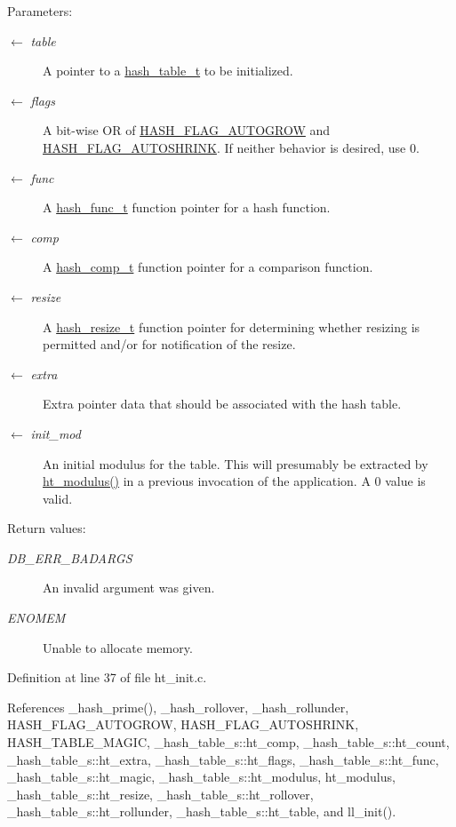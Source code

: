 \begin{Desc}
\item[Parameters:]
\begin{description}
\item[\mbox{$\leftarrow$} {\em table}]A pointer to a \hyperlink{group__dbprim__hash_ga1}{hash\_\-table\_\-t} to be initialized. \item[\mbox{$\leftarrow$} {\em flags}]A bit-wise OR of \hyperlink{group__dbprim__hash_ga22}{HASH\_\-FLAG\_\-AUTOGROW} and \hyperlink{group__dbprim__hash_ga23}{HASH\_\-FLAG\_\-AUTOSHRINK}. If neither behavior is desired, use 0. \item[\mbox{$\leftarrow$} {\em func}]A \hyperlink{group__dbprim__hash_ga4}{hash\_\-func\_\-t} function pointer for a hash function. \item[\mbox{$\leftarrow$} {\em comp}]A \hyperlink{group__dbprim__hash_ga5}{hash\_\-comp\_\-t} function pointer for a comparison function. \item[\mbox{$\leftarrow$} {\em resize}]A \hyperlink{group__dbprim__hash_ga6}{hash\_\-resize\_\-t} function pointer for determining whether resizing is permitted and/or for notification of the resize. \item[\mbox{$\leftarrow$} {\em extra}]Extra pointer data that should be associated with the hash table. \item[\mbox{$\leftarrow$} {\em init\_\-mod}]An initial modulus for the table. This will presumably be extracted by \hyperlink{group__dbprim__hash_ga29}{ht\_\-modulus()} in a previous invocation of the application. A 0 value is valid.\end{description}
\end{Desc}
\begin{Desc}
\item[Return values:]
\begin{description}
\item[{\em DB\_\-ERR\_\-BADARGS}]An invalid argument was given. \item[{\em ENOMEM}]Unable to allocate memory.\end{description}
\end{Desc}


Definition at line 37 of file ht\_\-init.c.

References \_\-hash\_\-prime(), \_\-hash\_\-rollover, \_\-hash\_\-rollunder, HASH\_\-FLAG\_\-AUTOGROW, HASH\_\-FLAG\_\-AUTOSHRINK, HASH\_\-TABLE\_\-MAGIC, \_\-hash\_\-table\_\-s::ht\_\-comp, \_\-hash\_\-table\_\-s::ht\_\-count, \_\-hash\_\-table\_\-s::ht\_\-extra, \_\-hash\_\-table\_\-s::ht\_\-flags, \_\-hash\_\-table\_\-s::ht\_\-func, \_\-hash\_\-table\_\-s::ht\_\-magic, \_\-hash\_\-table\_\-s::ht\_\-modulus, ht\_\-modulus, \_\-hash\_\-table\_\-s::ht\_\-resize, \_\-hash\_\-table\_\-s::ht\_\-rollover, \_\-hash\_\-table\_\-s::ht\_\-rollunder, \_\-hash\_\-table\_\-s::ht\_\-table, and ll\_\-init().

